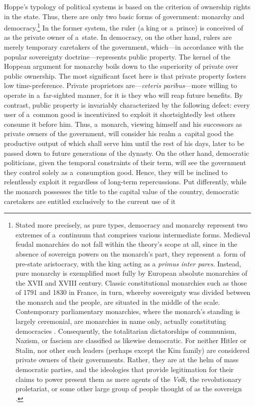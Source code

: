 Hoppe's typology of political systems is based on the criterion of ownership rights in the state. Thus, there are only two basic forms of government: monarchy and democracy.\footnote{Stated more precisely, as pure types, democracy and monarchy represent two extremes of a~continuum that comprises various intermediate forms. Medieval feudal monarchies do not fall within the theory's scope at all, since in the absence of sovereign powers on the monarch's part, they represent a~form of pre-state aristocracy, with the king acting as a \textit{primus inter pares}. Instead, pure monarchy is exemplified most fully by European absolute monarchies of the XVII and XVIII century. Classic constitutional monarchies such as those of 1791 and 1830 in France, in turn, whereby sovereignty was divided between the monarch and the people, are situated in the middle of the scale. Contemporary parliamentary monarchies, where the monarch's standing is largely ceremonial, are monarchies in name only, actually constituting democracies 
\parencites[][f.19]{hoppe_democracy_2007}[][pp.108–112]{hoppe_short_2015}. %
 Consequently, the totalitarian dictatorships of communism, Nazism, or fascism are classified as likewise democratic. For neither Hitler or Stalin, nor other such leaders (perhaps except the Kim family) are considered private owners of their governments. Rather, they are at the helm of mass democratic parties, and the ideologies that provide legitimation for their claims to power present them as mere agents of the \textit{Volk}, the revolutionary proletariat, or some other large group of people thought of as the sovereign 
\parencite[][p.179]{hoppe_eigentum_1987}. %
 } In the former system, the ruler (a king or a~prince) is conceived of as the private owner of a~state. In democracy, on the other hand, rulers are merely temporary caretakers of the government, which---in accordance with the popular sovereignty doctrine---represents public property. The kernel of the Hoppean argument for monarchy boils down to the superiority of private over public ownership. The most significant facet here is that private property fosters low time-preference. Private proprietors are---\textit{ceteris paribus}---more willing to operate in a~far-sighted manner, for it is they who will reap future benefits. By contrast, public property is invariably characterized by the following defect: every user of a~common good is incentivized to exploit it shortsightedly lest others consume it before him. Thus, a~monarch, viewing himself and his successors as private owners of the government, will consider his realm a~capital good the productive output of which shall serve him until the rest of his days, later to be passed down to future generations of the dynasty. On the other hand, democratic politicians, given the temporal constraints of their term, will see the government they control solely as a~consumption good. Hence, they will be inclined to relentlessly exploit it regardless of long-term repercussions. Put differently, while the monarch possesses the title to the capital value of the country, democratic caretakers are entitled exclusively to the current use of it 
